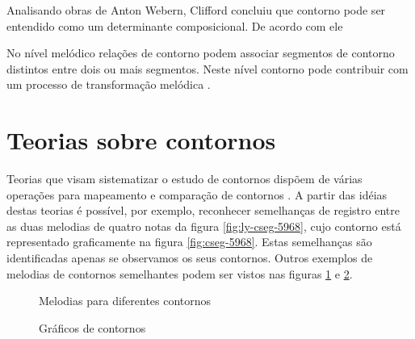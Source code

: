 Analisando obras de Anton Webern, Clifford concluiu que contorno pode
ser entendido como um determinante composicional. De acordo com ele

No nível melódico relações de contorno podem associar segmentos de
contorno distintos entre dois ou mais segmentos. Neste nível contorno
pode contribuir com um processo de transformação melódica
\cite[p. 159]{clifford95:contour}.

\section{Teorias sobre contornos}
\label{sec:teor-sobre-cont}

Teorias que visam sistematizar o estudo de contornos dispõem de várias
operações para mapeamento e comparação de contornos
\cite{friedmann85:methodology,friedmann87:response,morris87:composition,morris93:directions,marvin.ea87:relating,clifford95:contour,polansky.ea92:possible,quinn97:fuzzy,beard03:contour}
.  A partir das idéias destas teorias é
possível, por exemplo, reconhecer semelhanças de registro entre as
duas melodias de quatro notas da figura \ref{fig:ly-cseg-5968}, cujo
contorno está representado graficamente na figura
\ref{fig:cseg-5968}. Estas semelhanças são identificadas apenas se
observamos os seus contornos. Outros exemplos de melodias de contornos
semelhantes podem ser vistos nas figuras \ref{fig:melodias-cseg} e
\ref{fig:graficos-cseg}.

\begin{figure}
  \centering

  \caption{Melodias para diferentes contornos}
  \label{fig:melodias-cseg}
\end{figure}

\begin{figure}
  \centering
  \subfloat[contorno P(5 9 6 8)]{
    \texttt{[image: c-5968]}
    \label{fig:cseg-5968}
  }
  \subfloat[contorno Q(5 7 6 8)]{
    \texttt{[image: c-5768]}
    \label{fig:cseg-5768}
  }
  \subfloat[contorno R(3 0 5 1)]{
    \texttt{[image: c-3051]}

    \label{fig:cseg-3051}
  }
  \caption{Gráficos de contornos}
  \label{fig:graficos-cseg}
\end{figure}

